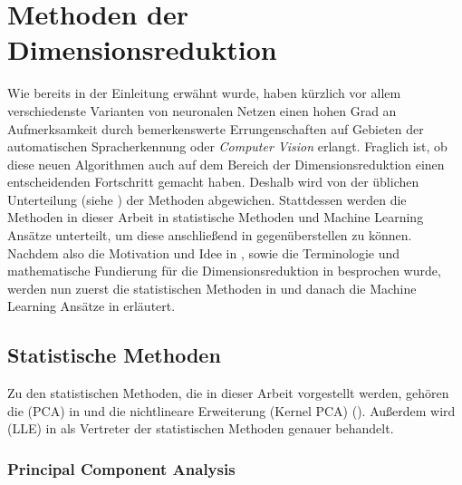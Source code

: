 \chapter{Methoden der Dimensionsreduktion}
\label{ch:MethodenDerDimRed}

Wie bereits in der Einleitung erwähnt wurde, haben kürzlich vor allem verschiedenste Varianten von
neuronalen Netzen einen hohen Grad an Aufmerksamkeit durch bemerkenswerte Errungenschaften auf
Gebieten der automatischen Spracherkennung oder \textit{Computer Vision} erlangt. Fraglich ist, ob
diese neuen Algorithmen auch auf dem Bereich der Dimensionsreduktion einen entscheidenden
Fortschritt gemacht haben. Deshalb wird von der üblichen Unterteilung (siehe
) der Methoden abgewichen. Stattdessen werden die Methoden
in dieser Arbeit in statistische Methoden und Machine Learning Ansätze unterteilt, um diese
anschließend in  gegenüberstellen zu können. Nachdem also die Motivation und
Idee in , sowie die Terminologie und mathematische Fundierung für die
Dimensionsreduktion in  besprochen wurde, werden nun zuerst die
statistischen Methoden in  und danach die Machine Learning
Ansätze in  erläutert.

\section{Statistische Methoden}
\label{ch:MethodenDerDimRed:statistisch}

Zu den statistischen Methoden, die in dieser Arbeit vorgestellt werden, gehören die
 (PCA) in 
und die nichtlineare Erweiterung  (Kernel PCA)
(). Außerdem wird  (LLE) in  als Vertreter der
statistischen Methoden genauer behandelt.

\subsection{Principal Component Analysis}
\label{ch:MethodenDerDimRed:statistisch:PCA}

